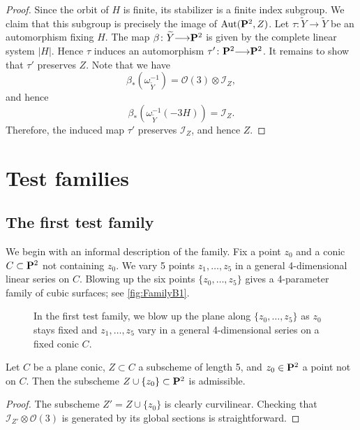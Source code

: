 \documentclass[12pt,reqno]{amsart}
\renewcommand{\to}{{\longrightarrow}}
\numberwithin{equation}{section}
\renewcommand{\O}{\mathcal O}
\begin{document}
\begin{proof}
  Since the orbit of $H$ is finite, its stabilizer is a finite index subgroup.
  We claim that this subgroup is precisely the image of $\Aut(\P^2, Z)$.
  Let $\tau \colon \widetilde Y \to \widetilde Y$ be an automorphism fixing $H$.
  The map $\beta \colon \widetilde Y \to \P^2$ is given by the complete linear system $|H|$.
  Hence $\tau$ induces an automorphism $\tau' \colon \P^2 \to \P^2$.
  It remains to show that $\tau'$ preserves $Z$.
  Note that we have
  \[ \beta_* \left(\omega_{\widetilde Y}^{-1}\right) = \O(3) \otimes \mathcal I_Z,\]
  and hence
  \[ \beta_* \left( \omega_{\widetilde Y}^{-1} (-3H) \right) = \mathcal I_Z.\]
  Therefore, the induced map $\tau'$ preserves $\mathcal I_Z$, and hence $Z$.
\end{proof}



\section{Test families}\label{sec:testfamilies}
\subsection{The first test family}
\label{sec:family-b_1}
We begin with an informal description of the family.
Fix a point $z_0$ and a conic $C \subset \P^2$ not containing $z_0$.
We vary 5 points $z_1, \dots, z_5$ in a general 4-dimensional linear series on $C$.
Blowing up the six points $\{z_0, \dots, z_5\}$ gives a 4-parameter family of cubic surfaces; see \autoref{fig:FamilyB1}.
\begin{figure}
  \centering
  
  \caption{In the first test family, we blow up the plane along $\{z_0, \dots, z_5\}$ as $z_0$ stays fixed and $z_1,\dots,z_5$ vary in a general 4-dimensional series on a fixed conic $C$.}
  \label{fig:FamilyB1}
\end{figure}

\begin{proposition}
  \label{prop:B1}
  Let $C$ be a plane conic, $Z \subset C$ a subscheme of length 5, and $z_0 \in \P^2$ a point not on $C$.
  Then the subscheme $Z \cup \{z_0\} \subset \P^2$ is admissible.
\end{proposition}
\begin{proof}
  The subscheme $Z' = Z \cup \{z_0\}$ is clearly curvilinear.
  Checking that $\mathcal I_{Z'} \otimes \O(3)$ is generated by its global sections is straightforward.
\end{proof}
\end{document}
